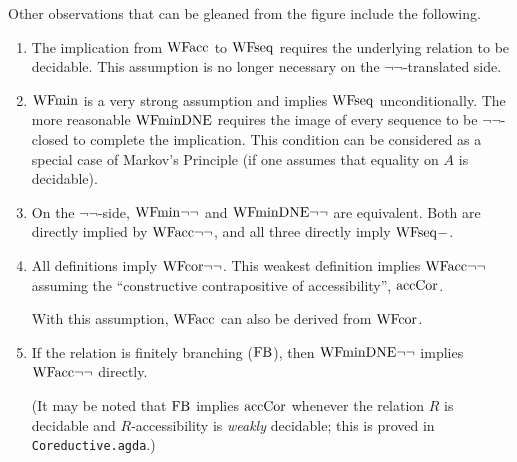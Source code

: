 Other observations that can be gleaned from the figure include the following.
\begin{enumerate}
  \item The implication from $\mathrm{WFacc}$ to $\mathrm{WFseq}$ requires the underlying relation to be decidable.
    This assumption is no longer necessary on the $\lnot\lnot$-translated side.
  \item $\mathrm{WFmin}$ is a very strong assumption and implies $\mathrm{WFseq}$ unconditionally.
  The more reasonable $\mathrm{WFminDNE}$ requires the image of every sequence to be $\lnot\lnot$-closed
  to complete the implication.  This condition can be considered as a special case of Markov's Principle
  (if one assumes that equality on $A$ is decidable).
  \item On the $\lnot\lnot$-side, $\mathrm{WFmin}{\lnot\lnot}$ and $\mathrm{WFminDNE}{\lnot\lnot}$ are equivalent. Both are directly implied by $\mathrm{WFacc}{\lnot\lnot}$,
    and all three directly imply $\mathrm{WFseq}{-}$.
  \item All definitions imply $\mathrm{WFcor}{\lnot\lnot}$.  This weakest definition implies $\mathrm{WFacc}{\lnot\lnot}$ assuming the
    ``constructive contrapositive of accessibility'', $\mathrm{accCor}$.
 
    With this assumption, $\mathrm{WFacc}$ can also be derived from $\mathrm{WFcor}$. %


  \item If the relation is finitely branching ($\mathrm{FB}$), then $\mathrm{WFminDNE}{\lnot\lnot}$
    implies $\mathrm{WFacc}{\lnot\lnot}$ directly.

    (It may be noted that $\mathrm{FB}$ implies $\mathrm{accCor}$ whenever the relation $R$ is decidable
    and $R$-accessibility is \emph{weakly} decidable;  this is proved in \texttt{Coreductive.agda}.)


\end{enumerate}
